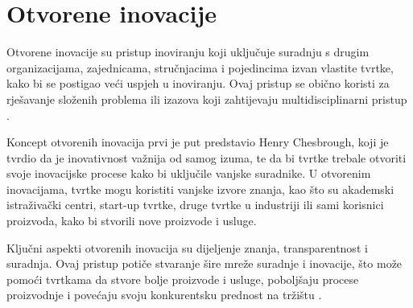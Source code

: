 \chapter{Otvorene inovacije}

Otvorene inovacije su pristup inoviranju koji uključuje suradnju s drugim
organizacijama, zajednicama, stručnjacima i pojedincima izvan vlastite tvrtke,
kako bi se postigao veći uspjeh u inoviranju. Ovaj pristup se obično koristi za
rješavanje složenih problema ili izazova koji zahtijevaju multidisciplinarni
pristup \citep{openinnovation2023}.

Koncept otvorenih inovacija prvi je put predstavio Henry Chesbrough, koji je
tvrdio da je inovativnost važnija od samog izuma, te da bi tvrtke trebale
otvoriti svoje inovacijske procese kako bi uključile vanjske suradnike. U
otvorenim inovacijama, tvrtke mogu koristiti vanjske izvore znanja, kao što su
akademski istraživački centri, start-up tvrtke, druge tvrtke u industriji ili
sami korisnici proizvoda, kako bi stvorili nove proizvode i usluge.

Ključni aspekti otvorenih inovacija su dijeljenje znanja, transparentnost i
suradnja. Ovaj pristup potiče stvaranje šire mreže suradnje i inovacije, što
može pomoći tvrtkama da stvore bolje proizvode i usluge, poboljšaju procese
proizvodnje i povećaju svoju konkurentsku prednost na tržištu \citep{openinnovation2023}.